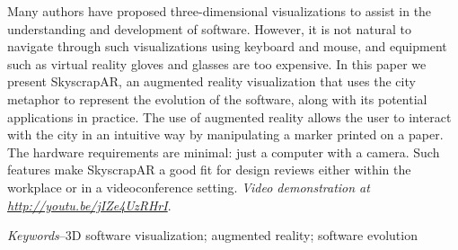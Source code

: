 Many authors have proposed three-dimensional visualizations to assist in the understanding and development of software. However, it is not natural to navigate through such visualizations using keyboard and mouse, and equipment such as virtual reality gloves and glasses are too expensive. In this paper we present SkyscrapAR, an augmented reality visualization that uses the city metaphor to represent the evolution of the software, along with its potential applications in practice. The use of augmented reality allows the user to interact with the city in an intuitive way by manipulating a marker printed on a paper. The hardware requirements are minimal: just a computer with a camera. Such features make SkyscrapAR a good fit for design reviews either within the workplace or in a videoconference setting. 
\emph{Video demonstration at \url{http://youtu.be/jIZe4UzRHrI}}.

\emph{Keywords}--3D software visualization; augmented reality; software evolution
